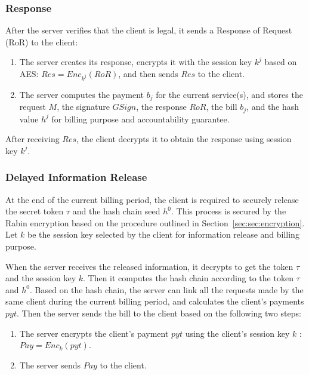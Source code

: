 \documentclass[letterpaper,12pt]{article}
\begin{document}
\subsubsection{Response}\label{sec:sec:response}
 After the server verifies that the client is legal, it sends a Response of Request (RoR) to the client:
\begin{enumerate}
\item  The server creates its response, encrypts it with the session key $k^j$ based on AES: $Res=Enc_{k^j}(RoR)$, and then sends $Res$ to the client.
\item  The server computes the payment $b_j$ for the current service(s), and stores the request $M$,  the signature $GSign$, the response $RoR$, the bill $b_j$, and the hash value $h^j$ for billing purpose and accountability guarantee.
\end{enumerate}

After receiving $Res$, the client decrypts it to obtain the response using session key $k^j$. %

\subsubsection {Delayed Information Release}\label{sec:sec:delayed}

 At the end of the current billing period, the client is required to securely release the secret token $\tau$ and the hash chain seed $h^0$. This process is secured by the Rabin encryption based on the procedure outlined in Section~\ref{sec:sec:encryption}. Let $k$ be the session key selected by the client for information release and billing purpose.

When the server receives the released information,  it decrypts to get the token $\tau$ and the session key $k$. Then it computes the hash chain according to the token $\tau$ and $h^0$. Based on the hash chain, the server can link all the requests made by the same client during the current billing period, and calculates the client's payments $pyt$. Then the server sends the bill to the client based on the following two steps:
\begin{enumerate}
\item  The server encrypts the client's payment $pyt$ using the client's session key $k$ : $Pay=Enc_{k}(pyt)$.

\item  The server sends $Pay$ to the client.
\end{enumerate}
\end{document}
